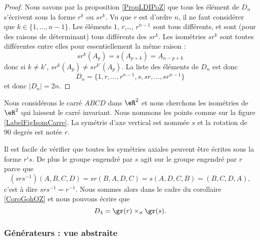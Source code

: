\begin{proof}
    Nous savons par la proposition \ref{PropLDIPoZ} que tous les élément de \( D_n\) s'écrivent sous la forme \( r^k\) ou \( sr^k\). Vu que \( r\) est d'ordre \( n\), il ne faut considérer que \( k\in\{ 1,\ldots, n-1 \}\). Les éléments \( 1\), \( r\),\ldots, \( r^{n-1}\) sont tous différents, et sont (pour des raisons de déterminant) tous différents des \( sr^k\). Les isométries \( sr^k\) sont toutes différentes entre elles pour essentiellement la même raison :
    \begin{equation}
        sr^k(A_p)=s(A_{p+k})=A_{n-p+k}
    \end{equation}
    donc si \( k\neq k'\), \( sr^k(A_p)\neq sr^{k'}(A_p)\). La liste des éléments de \( D_n\) est donc
    \begin{equation}
        D_n=\{ 1,r,\ldots, r^{n-1},s,sr,\ldots, sr^{n-1} \}
    \end{equation}
    et donc \( | D_n |=2n\).
\end{proof}

\begin{example}     \label{EXooHNYYooUDsKnm}
    Nous considérons le carré \( ABCD\) dans \( \eR^2\) et nous cherchons les isométries de \( \eR^2\) qui laissent le carré invariant. Nous nommons les points comme sur la figure \ref{LabelFigIsomCarre}. La symétrie d'axe vertical est nommée \( s\) et la rotation de \( 90\) degrés est notée \( r\).
    \newcommand{\CaptionFigIsomCarre}{Le carré dont nous étudions le groupe diédral.}
    

    Il est facile de vérifier que toutes les symétries axiales peuvent être écrites sous la forme \( r^is\). De plus le groupe engendré par \( s\) agit sur le groupe engendré par \( r\) parce que
    \begin{equation}
        (srs^{-1})(A,B,C,D)=sr(B,A,D,C)=s(A,D,C,B)=(B,C,D,A),
    \end{equation}
    c'est à dire \( srs^{-1}=r^{-1}\). Nous sommes alors dans le cadre du corollaire \ref{CoroGohOZ} et nous pouvons écrire que
    \begin{equation}
        D_4=\gr(r)\times_{\sigma}\gr(s).
    \end{equation}
\end{example}

\subsubsection{Générateurs : vue abstraite}

